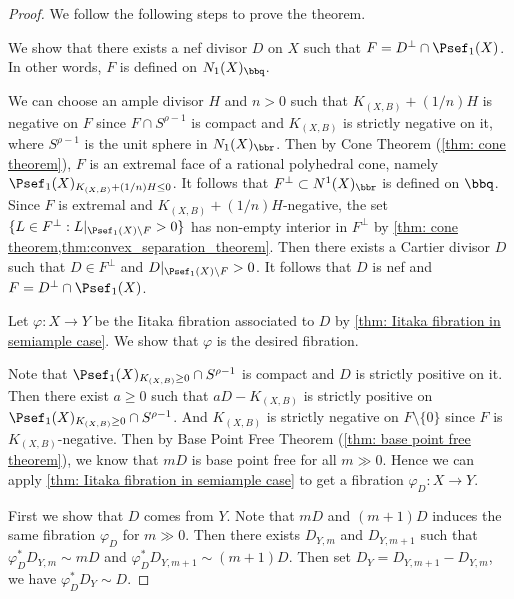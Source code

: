     \begin{proof}
        We follow the following steps to prove the theorem.
        \begin{step}\label{step:K_negative_face_is_rational_in_thm:contraction_theorem}
            We show that there exists a nef divisor \(D\) on \(X\) such that \(F = D^\perp \cap \Psef_1(X)\).
            In other words, \(F\) is defined on \(N_1(X)_\bbq\).
        \end{step}
        We can choose an ample divisor \(H\) and \(n > 0\) such that \(K_{(X,B)}+(1/n)H\) is negative on \(F\) since \(F \cap S^{\rho-1}\) is compact and \(K_{(X,B)}\) is strictly negative on it,
        where \(S^{\rho-1}\) is the unit sphere in \(N_1(X)_\bbr\).
        Then by Cone Theorem (\cref{thm: cone theorem}), \(F\) is an extremal face of a rational polyhedral cone, namely \(\Psef_1(X)_{K_{(X,B)}+(1/n) H \leq 0}\).
        It follows that \(F^\perp \subset N^1(X)_\bbr\) is defined on \(\bbq\).
        Since \(F\) is extremal and \(K_{(X,B)}+(1/n)H\)-negative, the set \(\{L \in F^\perp: L|_{\Psef_1(X)\setminus F}>0\}\) has non-empty interior in \(F^\perp\) by \cref{thm: cone theorem,thm:convex_separation_theorem}.
        Then there exists a Cartier divisor \(D\) such that \(D \in F^\perp\) and \(D|_{\Psef_1(X)\setminus F} > 0\).
        It follows that \(D\) is nef and \(F = D^\perp \cap \Psef_1(X)\).
        
        \begin{step}
            Let \(\varphi: X \to Y\) be the Iitaka fibration associated to \(D\) by \cref{thm: Iitaka fibration in semiample case}.
            We show that \(\varphi\) is the desired fibration.
        \end{step}
        Note that \(\Psef_1(X)_{K_{(X,B)} \geq 0} \cap S^{\rho-1}\) is compact and \(D\) is strictly positive on it.
        Then there exist \(a \geq 0\) such that \(aD - K_{(X,B)}\) is strictly positive on \(\Psef_1(X)_{K_{(X,B)} \geq 0} \cap S^{\rho-1}\).
        And \(K_{(X,B)}\) is strictly negative on \(F\setminus \{0\}\) since \(F\) is \(K_{(X,B)}\)-negative.
        Then by Base Point Free Theorem (\cref{thm: base point free theorem}), we know that \(mD\) is base point free for all \(m \gg 0\).
        Hence we can apply \cref{thm: Iitaka fibration in semiample case} to get a fibration \(\varphi_D: X \to Y\).

        First we show that \(D\) comes from \(Y\).
        Note that \(mD\) and \((m+1)D\) induces the same fibration \(\varphi_D\) for \(m \gg 0\).
        Then there exists \(D_{Y,m}\) and \(D_{Y,m+1}\) such that \(\varphi_D^* D_{Y,m} \sim mD\) and \(\varphi_D^* D_{Y,m+1} \sim (m+1)D\).
        Then set \(D_Y = D_{Y,m+1} - D_{Y,m}\), we have \(\varphi_D^* D_Y \sim D\).


\end{proof}
